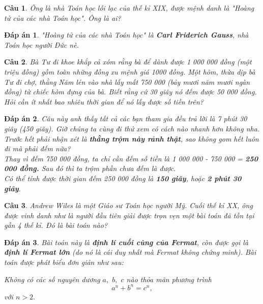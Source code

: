 \documentclass[12pt,a4paper]{article}
\newtheorem{ques}{Câu}
\theoremstyle{nonumberplain}
\newtheorem{ans}{Đáp án}
\begin{document}
\begin{ques}
Ông là nhà Toán học lỗi lạc của thế kỉ XIX, được mệnh danh là \textit{"Hoàng tử của các nhà Toán học"}. Ông là ai?
\end{ques}
\begin{mybox} \begin{ans}
\textit{"Hoàng tử của các nhà Toán học"} là \textbf{Carl Friderich Gauss}, nhà Toán học người Đức nè.
\end{ans} \end{mybox}
\begin{ques}
Bà Tư đi khoe khắp cả xóm rằng bà để dành được 1 000 000 đồng (một triệu đồng) gồm toàn những đồng xu mệnh giá 1000 đồng. Một hôm, thừa dịp bà Tư đi chợ, thằng Năm lẻn vào nhà lấy mất 750 000 (bảy mươi năm mươi ngàn đồng) từ chiếc hòm đựng của bà. Biết rằng cứ 30 giây nó đếm được 50 000 đồng. Hỏi cần ít nhất bao nhiêu thời gian để nó lấy được số tiền trên?
\end{ques}
\begin{mybox} \begin{ans}
Câu này anh thấy tất cả các bạn tham gia đều trả lời là 7 phút 30 giây (450 giây). Giờ chúng ta cùng đi thử xem có cách nào nhanh hơn không nha.\\
Trước hết phải nhận xét là \textbf{thằng trộm này rảnh thật}, sao không gom hết luôn đi mà phải đếm nữa?\\
Thay vì đếm 750 000 đồng, ta chỉ cần đếm số tiền là 1 000 000 - 750 000 = \textbf{250 000 đồng.} Sau đó thì ta trộm phần chưa đếm là được. \\
Có thể tính được thời gian đếm 250 000 đồng là \textbf{150 giây}, hoặc \textbf{2 phút 30 giây}.
\end{ans} \end{mybox}
\begin{ques}
Andrew Wiles là một Giáo sư Toán học người Mỹ. Cuối thế kỉ XX, ông được vinh danh như là người đầu tiên giải được trọn vẹn một bài toán đã tồn tại gần 4 thế kỉ. Đó là bài toán nào?
\end{ques}
\begin{mybox} \begin{ans}
Bài toán này là \textbf{định lí cuối cùng của Fermat}, còn được gọi là \textbf{định lí Fermat lớn} (do nó là cái duy nhất mà Fermat không chứng minh). Bài toán được phát biểu đơn giản như sau:
\begin{center}
Không có các số nguyên dương \(a,\) \(b,\) \(c\) nào thỏa mãn phương trình 
\[a^n + b^n = c^n,\]
với \(n > 2.\)
\end{center}
\end{ans} \end{mybox}
\end{document}
